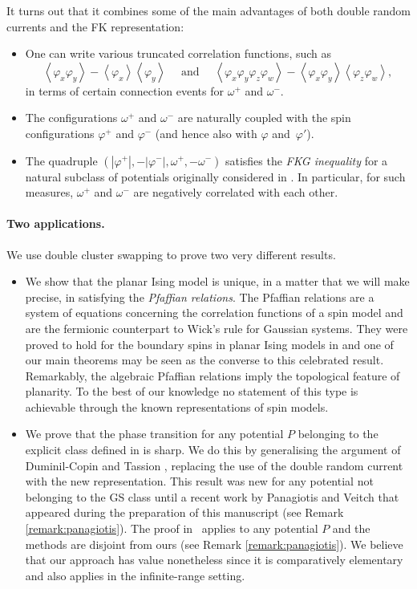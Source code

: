 \documentclass{article}
\numberwithin{equation}{section}
\theoremstyle{definition}
\theoremstyle{definition}
\theoremstyle{remark}
\newcommand\vp{\varphi}
\newcommand{\w}{\omega}
\begin{document}
It turns out that it combines some of the main advantages of both double random currents and the FK representation:
\begin{itemize}
\item One can write various truncated correlation functions, such as 
\[
\left< \vp_x \vp_y \right> - \left<\vp_x  \right> \left<\vp_y \right> \quad \text{ and } \quad \left<\vp_x \vp_y \vp_z \vp_w \right> - \left<\vp_x \vp_y \right> \left<\vp_z \vp_w \right>,
\] 
	in terms of certain connection events for $\w^+$ and $\w^-$.
\item The configurations $\w^+$ and $\w^-$ are naturally coupled with the spin configurations $\vp^+$ and $\vp^-$ (and hence also with $\vp$ and~$\vp'$).
\item The quadruple $(|\vp^+|,-|\vp^-|,\w^+,-\w^-)$ satisfies the \emph{FKG inequality} for a natural subclass of potentials originally considered in \cite{ellis1976ghs}. 
In particular, for such measures, $\w^+$ and $\w^-$ are negatively correlated with each other.
\end{itemize}


\paragraph{Two applications. } We use double cluster swapping to prove two very different results. 
\begin{itemize}
	\item We show that the planar Ising model is unique, in a matter that we will make precise, in satisfying the \emph{Pfaffian relations}. The Pfaffian relations are a system of equations concerning the correlation functions of a spin model and are the fermionic counterpart to Wick's rule for Gaussian systems. They were proved to hold for the boundary spins in planar Ising models in \cite{GBK} and one of our main theorems may be seen as the converse to this celebrated result. Remarkably, the algebraic Pfaffian relations imply the topological feature of planarity.
		To the best of our knowledge no statement of this type is achievable through the known representations of spin models. 

	\item We prove that the phase transition for any potential $P$ belonging to the explicit class defined in \cite{ellis1976ghs} is sharp. We do this by generalising the argument of Duminil-Copin and Tassion \cite{DCT}, replacing the use of the double random current with the new representation. This result was new for any potential not belonging to the GS class until a recent work by Panagiotis and Veitch \cite{panagiotis2026subcritical} that appeared during the preparation of this manuscript (see Remark \ref{remark:panagiotis}). The proof in~\cite{panagiotis2026subcritical} applies to any potential $P$ and the methods are disjoint from ours (see Remark \ref{remark:panagiotis}). We believe that our approach has value nonetheless since it is comparatively elementary and also applies in the infinite-range setting.
\end{itemize}
\end{document}
